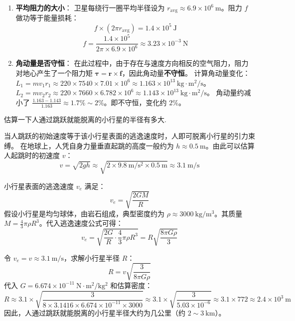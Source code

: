 \begin{solution}
\begin{enumerate}
    \item[(d)] \textbf{平均阻力的大小}：
    卫星每绕行一圈平均半径设为 $r_{\text{avg}} \approx 6.9 \times 10^6 \ \mathrm{m}$。阻力 $f$ 做功等于能量损耗：
    $$ f \times (2\pi r_{\text{avg}}) = 1.4 \times 10^5 \ \mathrm{J} $$
    $$ f = \frac{1.4 \times 10^5}{2\pi \times 6.9 \times 10^6} \approx 3.23 \times 10^{-3} \ \mathrm{N} $$

    \item[(e)] \textbf{角动量是否守恒}：
    在此过程中，由于存在与速度方向相反的空气阻力，阻力对地心产生了一个阻力矩 $\boldsymbol{\tau} = \boldsymbol{r} \times \boldsymbol{f}$，因此角动量\textbf{不守恒}。
    计算角动量变化：$L_1 = m v_1 r_1 \approx 220 \times 7540 \times 7.01 \times 10^6 \approx 1.163 \times 10^{13} \ \mathrm{kg \cdot m^2/s}$。
    $L_2 = m v_2 r_2 \approx 220 \times 7660 \times 6.782 \times 10^6 \approx 1.143 \times 10^{13} \ \mathrm{kg \cdot m^2/s}$。
    角动量约减小了 $\frac{1.163 - 1.143}{1.163} \approx 1.7\% \sim 2\%$。即不守恒，变化约 $2\%$。
\end{enumerate}
\end{solution}

\begin{exercise}\label{ex:4.6}
估算一下人通过跳跃就能脱离的小行星的半径有多大.
\end{exercise}
\begin{solution}
当人跳跃的初始速度等于该小行星表面的逃逸速度时，人即可脱离小行星的引力束缚。
在地球上，人凭自身力量垂直起跳的高度一般约为 $h \approx 0.5 \ \mathrm{m}$。由此可以估算人起跳时的初速度 $v$：
$$ v = \sqrt{2gh} \approx \sqrt{2 \times 9.8 \ \mathrm{m/s^2} \times 0.5 \ \mathrm{m}} \approx 3.1 \ \mathrm{m/s} $$

小行星表面的逃逸速度 $v_e$ 满足：
$$ v_e = \sqrt{\frac{2GM}{R}} $$
假设小行星是均匀球体，由岩石组成，典型密度约为 $\rho \approx 3000 \ \mathrm{kg/m^3}$。其质量 $M = \frac{4}{3}\pi \rho R^3$。代入逃逸速度公式可得：
$$ v_e = \sqrt{ \frac{2G}{R} \cdot \frac{4}{3}\pi \rho R^3 } = R \sqrt{\frac{8\pi G \rho}{3}} $$

令 $v_e = v \approx 3.1 \ \mathrm{m/s}$，求解小行星半径 $R$：
$$ R = v \sqrt{\frac{3}{8\pi G \rho}} $$
代入 $G = 6.674 \times 10^{-11} \ \mathrm{N \cdot m^2 / kg^2}$ 和估算密度：
$$ R \approx 3.1 \times \sqrt{\frac{3}{8 \times 3.1416 \times 6.674 \times 10^{-11} \times 3000}} \approx 3.1 \times \sqrt{\frac{3}{5.03 \times 10^{-6}}} \approx 3.1 \times 772 \approx 2.4 \times 10^3 \ \mathrm{m} $$
因此，人通过跳跃就能脱离的小行星半径大约为几公里（约 $2 \sim 3 \ \mathrm{km}$）。
\end{solution}


